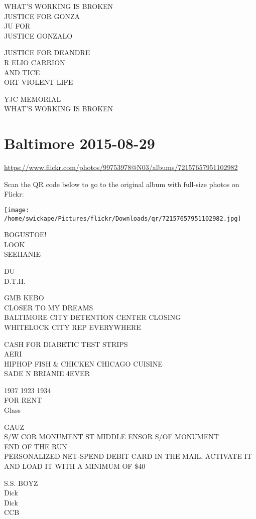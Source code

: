 \documentclass[10pt,letterpaper]{article}
\begin{document}
WHAT'S WORKING IS BROKEN\\
JUSTICE FOR GONZA\\
JU FOR\\
JUSTICE GONZALO

JUSTICE FOR DEANDRE\\
R ELIO CARRION\\
AND TICE\\
ORT VIOLENT LIFE

YJC MEMORIAL\\
WHAT'S WORKING IS BROKEN
\pagebreak

\section*{Baltimore 2015-08-29}

\url{https://www.flickr.com/photos/99753978@N03/albums/72157657951102982}

Scan the QR code below to go to the original album with full-size photos on Flickr:

\texttt{[image: /home/swickape/Pictures/flickr/Downloads/qr/72157657951102982.jpg]}
\pagebreak

BOGUSTOE!\\
LOOK\\
SEEHANIE

DU\\
D.T.H.

GMB KEBO\\
CLOSER TO MY DREAMS\\
BALTIMORE CITY DETENTION CENTER CLOSING\\
WHITELOCK CITY REP EVERYWHERE

CASH FOR DIABETIC TEST STRIPS\\
AERI\\
HIPHOP FISH \& CHICKEN CHICAGO CUISINE\\
SADE N BRIANIE 4EVER

1937 1923 1934\\
FOR RENT\\
Glass

GAUZ\\
S/W COR MONUMENT ST MIDDLE ENSOR S/OF MONUMENT\\
END OF THE RUN\\
PERSONALIZED NET{-}SPEND DEBIT CARD IN THE MAIL, ACTIVATE IT AND LOAD IT WITH A MINIMUM OF \$40

S.S. BOYZ\\
Dick\\
Dick\\
CCB
\end{document}

